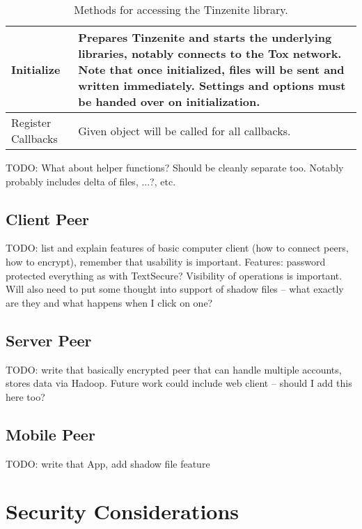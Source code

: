 \begin{table}[H]
\centering
\begin{tabulary}{\textwidth}{p{2.5cm} || J}
	Initialize & Prepares Tinzenite and starts the underlying libraries, notably connects to the Tox network. Note that once initialized, files will be sent and written immediately. Settings and options must be handed over on initialization.\\
	\hline
    Register Callbacks & Given object will be called for all callbacks.\\
\end{tabulary}
\caption[Tinzenite Library API]{Methods for accessing the Tinzenite library.}
\label{table:lib:api}
\end{table}

TODO: What about helper functions?
Should be cleanly separate too.
Notably probably includes delta of files, ...?, etc.

\subsection{Client Peer}

TODO: list and explain features of basic computer client (how to connect peers, how to encrypt), remember that usability is important.
Features: password protected everything as with TextSecure?
Visibility of operations is important.
Will also need to put some thought into support of shadow files – what exactly are they and what happens when I click on one?

\subsection{Server Peer}

TODO: write that basically encrypted peer that can handle multiple accounts, stores data via Hadoop.
Future work could include web client – should I add this here too?

\subsection{Mobile Peer}

TODO: write that App, add shadow file feature

\section{Security Considerations}
\label{sec:Security Considerations}

